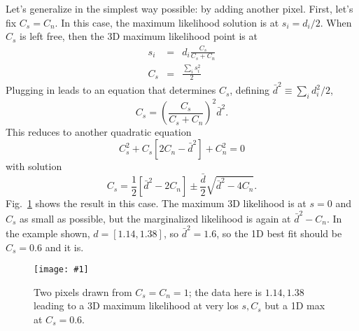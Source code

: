 \documentclass[11pt, oneside]{article}   	%
\def\be{\begin{equation}}
\def\ee{\end{equation}}
\def\bea{\begin{eqnarray}}
\def\eea{\end{eqnarray}}
\newcommand{\vs}{\nonumber\\}
\newcommand{\sfig}[2]{
\texttt{[image: \#1]}
        }
\newcommand{\Spng}[2]{
   \begin{figure}[thbp]
   \begin{center}
    \sfig{#1.png}{0.9\columnwidth}
    \caption{{\small #2}}
    \label{fig:#1}
     \end{center}
   \end{figure}
}
\newcommand{\rf}[1]{\ref{fig:#1}}
\begin{document}
Let's generalize in the simplest way possible: by adding another pixel. First, let's fix $C_s=C_n$. In this case, the maximum likelihood solution is at $s_i=d_i/2.$ When $C_s$ is left free, then the 3D maximum likelihood point is at 
\bea
s_i &=& d_i \frac{C_s}{C_s+C_n}\vs
C_s &=& \frac{\sum_i s_i^2}{2}
\eea
Plugging in leads to an equation that determines $C_s$, defining $\bar d^2\equiv \sum_i d_i^2/2$,
\be
C_s =  \left(\frac{C_s}{C_s+C_n} \right)^2\bar d^2.\ee
This reduces to another quadratic equation
\be
C_s^2 + C_s\left[ 2C_n - \bar d^2 \right] + C_n^2=0\ee
with solution
\be
C_s = \frac12 \left[ \bar d^2-2C_n\right] \pm \frac{\bar d}2\sqrt{\bar d^2-4C_n}
.\ee
Fig.~\rf{3d} shows the result in this case. The maximum 3D likelihood is at $s=0$ and $C_s$ as small as possible, but the marginalized likelihood is again at $\bar d^2-C_n$. In the example shown, $d=[1.14,1.38]$, so $\bar d^2=1.6$, so the 1D best fit should be $C_s=0.6$ and it is.
\Spng{3d}{Two pixels drawn from $C_s=C_n=1$; the data here is $1.14,1.38$ leading to a 3D maximum likelihood at very los $s,C_s$ but a 1D max at $C_s=0.6$.}
\end{document}
